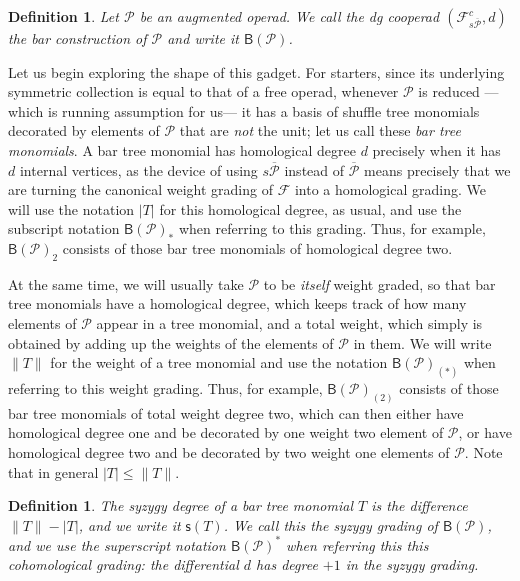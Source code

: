 \documentclass[fleqn, a4paper, twoside]{article}
\newcommand{\0}{\langle 0\rangle}
\newcommand{\FF}{\mathcal{F}}
\newcommand{\B}[1]{\mathsf{B}(#1)}
\newcommand{\syz}[1]{\mathsf{s}(#1)}
\DeclareRobustCommand{\[}{\begin{equation}}%
\DeclareRobustCommand{\]}{\end{equation}}%
\theoremstyle{mytheorem}
\theoremstyle{introthm}
\theoremstyle{mydefinition}
\newtheorem{definition}[theorem]{Definition}
\theoremstyle{mydefinition2}
\theoremstyle{plain} %
\newcommand{\?}{\,?\,}
\newcommand{\PP}{{\mathcal{P}}}
\theoremstyle{mytheorem}
\theoremstyle{plain} %
\begin{document}

\begin{definition}
Let $\PP$ be an augmented operad. 
We call the dg cooperad $(\FF_{s\overline{\PP}}^c ,d)$
the bar construction of $\PP$ and write it $\B{\PP}$.
\end{definition}

Let us begin exploring the shape of this gadget. For starters,
since its underlying symmetric collection is equal to that of
a free operad, whenever $\PP$ is reduced ---which is running
assumption for us--- it has a basis of shuffle tree monomials
decorated by elements of $\PP$ that are \emph{not} the unit;
let us call these \emph{bar tree monomials}. A bar tree monomial
has homological degree $d$ precisely when it has $d$ internal
vertices, as the device of using $s\overline{\PP}$ instead of
$\overline\PP$ means precisely that we are turning the canonical
weight grading of $\FF$ into a homological grading. We will
use the notation $|T|$ for this homological degree, as usual,
and use the subscript notation $\B{\PP}_*$ when referring to
this grading. Thus, for example,  $\B{\PP}_2$ consists of
those bar tree monomials of homological degree two.


At the same time, we will usually take $\PP$ to be \emph{itself}
weight graded, so that bar tree monomials have a homological
degree, which keeps track of how many elements of $\PP$ appear
in a tree monomial, and a total weight, which simply is obtained
by adding up the weights of the elements of $\PP$ in them.
We will write $\lVert T\rVert$ for the weight of a tree monomial
and use the notation $\B{\PP}_{(*)}$ when referring to this
weight grading. Thus, for example, $\B{\PP}_{(2)}$ consists of
those bar tree monomials of total weight degree two, which
can then either have homological degree one and be decorated by
one weight two element of $\PP$, or have homological degree two
and be decorated by two weight one elements of $\PP$. Note
that in general $|T|\leqslant \lVert T\rVert$.

\begin{definition}
The syzygy degree of a bar tree monomial $T$ is the difference
$\lVert T\rVert - |T|$, and we write it $\syz{T}$. We call this
the syzygy grading of $\B{\PP}$, and we use the superscript
notation $\B{\PP}^*$ when referring this this cohomological
grading: the differential $d$ has degree $+1$ in the syzygy
grading.
\end{definition}
\end{document}
